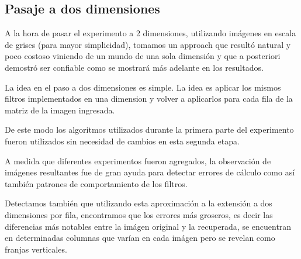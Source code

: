 \subsection{Pasaje a dos dimensiones}

A la hora de pasar el experimento a 2 dimensiones, utilizando im\'agenes en
escala de grises (para mayor simplicidad), tomamos un approach que result\'o
natural y poco costoso viniendo de un mundo de una sola dimensi\'on y que a
posteriori demostr\'o ser confiable como se mostrar\'a m\'as adelante en los
resultados.

La idea en el paso a dos dimensiones es simple. La idea es aplicar los mismos
filtros implementados en una dimension y volver a aplicarlos para cada fila de
la matriz de la imagen ingresada.

De este modo los algoritmos utilizados durante la primera parte del experimento
fueron utilizados sin necesidad de cambios en esta segunda etapa.

A medida que diferentes experimentos fueron agregados, la observaci\'on de
im\'agenes resultantes fue de gran ayuda para detectar errores de c\'alculo como
as\'i tambi\'en patrones de comportamiento de los filtros.

Detectamos tambi\'en que utilizando esta aproximaci\'on a la extensi\'on a dos
dimensiones por fila, encontramos que los errores m\'as groseros, es decir las
diferencias m\'as notables entre la im\'agen original y la recuperada, se
encuentran en determinadas columnas que var\'ian en cada im\'agen pero se
revelan como franjas verticales.

